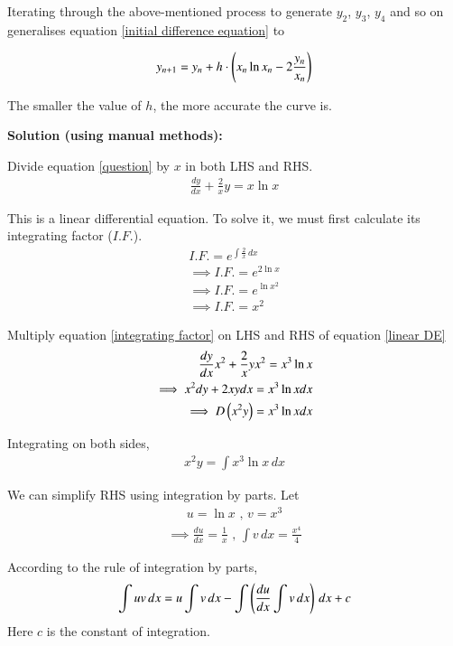 \documentclass[journal]{IEEEtran}
\begin{document}
Iterating through the above-mentioned process to generate $y_2$, $y_3$, $y_4$ and so on generalises equation \eqref{initial difference equation} to

\begin{align}
y_{n+1} = y_n + h\cdot\left(x_n\ln{x_n} - 2\frac{y_n}{x_n}\right)
\end{align}

The smaller the value of $h$, the more accurate the curve is. 

\newpage

\textbf{Solution (using manual methods):}

Divide equation \eqref{question} by $x$ in both LHS and RHS.
\begin{align}
\frac{dy}{dx} + \frac{2}{x}y = x\ln{x} \label{linear DE}
\end{align}

This is a linear differential equation. To solve it, we must first calculate its integrating factor ($I.F.$).
\begin{align}
I.F. = e^{\int \frac{2}{x} \,dx} \\
\implies I.F. = e^{2\ln{x}} \\
\implies I.F. = e^{\ln{x^2}} \\
\implies I.F. = x^2 \label{integrating factor}
\end{align}

Multiply equation \eqref{integrating factor} on LHS and RHS of equation \eqref{linear DE}
\begin{align}
\frac{dy}{dx}x^2 + \frac{2}{x}yx^2 = x^3\ln{x} \\
\implies x^2dy + 2xydx = x^3\ln{x}dx \\
\implies D\left(x^2y\right) = x^3\ln{x}dx
\end{align}

Integrating on both sides,
\begin{align}
x^2y = \int x^3\ln{x} \,dx \label{calculate RHS}
\end{align}

We can simplify RHS using integration by parts. Let
\begin{align}
u = \ln{x} \text{ , } v = x^3 \label{u and v}
\end{align}
\begin{align}
\implies \frac{du}{dx} = \frac{1}{x} \text{ , } \int v \,dx = \frac{x^4}{4} \label{u and v modif}
\end{align}

According to the rule of integration by parts, 
\begin{align}
\int uv \,dx = u\int v \, dx - \int \left(\frac{du}{dx} \int v \, dx\right) \,dx + c \label{integration by parts}
\end{align}
Here $c$ is the constant of integration. \\
\end{document}
